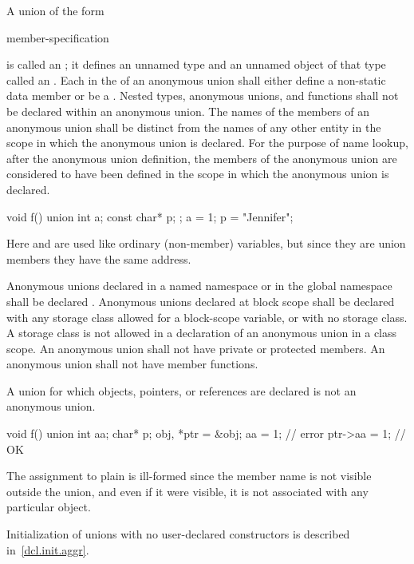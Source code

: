 \pnum
A union of the form
\begin{ncsimplebnf}
 \terminal{\{} member-specification \terminal{\}} \terminal{;}
\end{ncsimplebnf}
is called an ; it defines an unnamed type and
an unnamed object of that type called an .
Each  in the 
of an anonymous union shall either define a non-static data member or be a
.
Nested types, anonymous unions, and functions
shall not be declared within an anonymous union.
The names of the members of an anonymous union shall be distinct from
the names of any other entity in the scope in which the anonymous union
is declared. For the purpose of name lookup, after the anonymous union
definition, the members of the anonymous union are considered to have
been defined in the scope in which the anonymous union is declared.
%
\begin{example}
\begin{codeblock}
void f() {
  union { int a; const char* p; };
  a = 1;
  p = "Jennifer";
}
\end{codeblock}

Here  and  are used like ordinary (non-member)
variables, but since they are union members they have the same address.
\end{example}

\pnum
{}%
%
Anonymous unions declared in a named namespace or in the global
namespace shall be declared . Anonymous unions declared at
block scope shall be declared with any storage class allowed for a
block-scope variable, or with no storage class. A storage class is not
allowed in a declaration of an anonymous union in a class scope.
%
%
An anonymous union shall not have private or protected
members. An anonymous union shall not have
member functions.

\pnum
A union for which objects, pointers, or references are declared is not an anonymous union.
\begin{example}
\begin{codeblock}
void f() {
  union { int aa; char* p; } obj, *ptr = &obj;
  aa = 1;           // error
  ptr->aa = 1;      // OK
}
\end{codeblock}

The assignment to plain  is ill-formed since the member name
is not visible outside the union, and even if it were visible, it is not
associated with any particular object.
\end{example}
\begin{note}
Initialization of unions with no user-declared constructors is described
in~\ref{dcl.init.aggr}.
\end{note}

